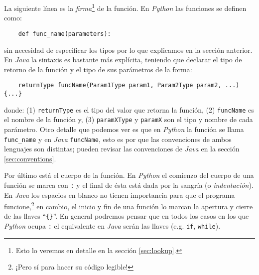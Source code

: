   La siguiente línea es la \textit{firma}\footnote{Esto lo veremos en detalle en la sección 
  \ref{sec:lookup}.} de la función.
  En \textit{Python} las funciones se definen como:
  \begin{verbatim}
    def func_name(parameters):
  \end{verbatim}
  sin necesidad de especificar los tipos por lo que explicamos en la sección anterior.
  En \textit{Java} la sintaxis es bastante más explícita, teniendo que declarar el tipo de retorno de
  la función y el tipo de sus parámetros de la  forma:
  \begin{verbatim}
    returnType funcName(Param1Type param1, Param2Type param2, ...) {...}
  \end{verbatim}
  donde: (1) \texttt{returnType} es el tipo del valor que retorna la función, (2) \texttt{funcName} es
  el nombre de la función y, (3) \texttt{paramXType} y \texttt{paramX} son el tipo y nombre de cada 
  parámetro.
  Otro detalle que podemos ver es que en \textit{Python} la función se llama \texttt{func\_name} y en 
  \textit{Java} \texttt{funcName}, esto es por que las convenciones de ambos lenguajes son 
  distintas; pueden revisar las convenciones de \textit{Java} en la sección \ref{sec:conventions}.
  
  Por último está el cuerpo de la función. 
  En \textit{Python} el comienzo del cuerpo de una función se marca con \texttt{:} y el final de 
  ésta está dada por la sangría (o \textit{indentación}).
  En \textit{Java} los espacios en blanco no tienen importancia para que el programa 
  funcione,\footnote{¡Pero sí para hacer su código legible!} en cambio, el inicio y fin de una 
  función lo marcan la apertura y cierre de las llaves \enquote{\texttt{\{\}}}.
  En general podremos pensar que en todos los casos en los que \textit{Python} ocupa \texttt{:} el
  equivalente en \textit{Java} serán las llaves (e.g. \texttt{if}, \texttt{while}).